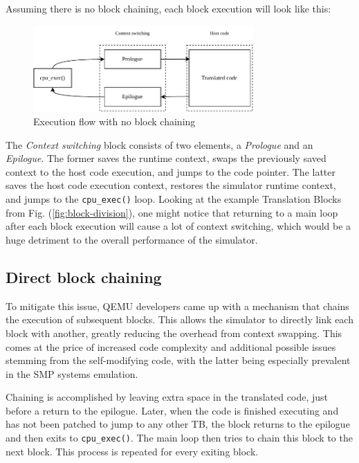 Assuming there is no block chaining, each block execution will look like this:
\begin{figure}[h]
	\centering
	\includegraphics[width=0.75\textwidth]{figures/TbExecution-NoChain.pdf}
	\caption{Execution flow with no block chaining}
\end{figure}

\noindent
The \textit{Context switching} block consists of two elements, a \textit{Prologue} and an \textit{Epilogue}. The former
saves the runtime context, swaps the previously saved context to the host code execution, and jumps to the code pointer.
The latter saves the host code execution context, restores the simulator runtime context, and jumps to the
\texttt{cpu\_exec()} loop.
Looking at the example Translation Blocks from Fig. (\ref{fig:block-division}), one might notice that returning to a
main loop after each block execution will cause a lot of context switching, which would be a huge detriment to the
overall performance of the simulator.

\subsection*{Direct block chaining}

To mitigate this issue, QEMU developers came up with a mechanism that chains the execution of subsequent blocks. This allows the
simulator to directly link each block with another, greatly reducing the overhead from context swapping.
This comes at the price of increased code complexity and additional possible issues stemming from the
self-modifying code, with the latter being especially prevalent in the SMP systems emulation.

Chaining is accomplished by leaving extra space in the translated code, just before a return to the epilogue. Later, when
the code is finished executing and has not been patched to jump to any other TB, the block returns to the epilogue and then
exits to \texttt{cpu\_exec()}. The main loop then tries to chain this block to the next block. This
process is repeated for every exiting block.

